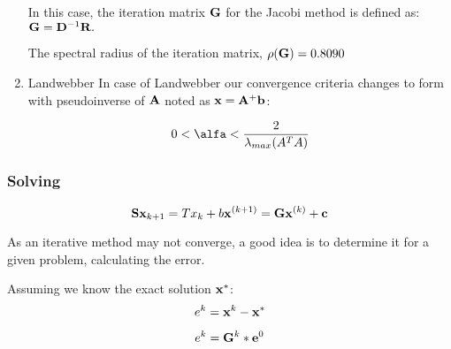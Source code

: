 \begin{enumerate}
    In this case, the iteration matrix $ \mathbf{G} $ for the Jacobi method is defined as:
    $ \mathbf{G} = \mathbf{D}^{-1}\mathbf{R}. $

    The spectral radius of the iteration matrix, $ \rho(\mathbf{G}) = 0.8090$

  \item Landwebber
  In case of Landwebber our convergence criteria changes to form with pseudoinverse of $\mathbf{A}$ noted as $\mathbf{x} = \mathbf{A}^+ \mathbf{b}$:
  
  \begin{equation*}
    0 < \alfa < \frac{2}{\lambda_{max}(A^TA)}
  \end{equation*}
\end{enumerate}
\subsubsection*{Solving}

\begin{equation*}
  \mathbf{S}\mathbf{x}_{k+1} = Tx_k + b
  \mathbf{x}^{(k+1)} = \mathbf{G}\mathbf{x}^{(k)} + \mathbf{c}
\end{equation*}

As an iterative method may not converge, a good idea is to determine it for a given problem, calculating the error.

Assuming we know the exact solution $\mathbf{x}^*$:
\begin{equation*}
  e^k = \mathbf{x}^k - \mathbf{x}^*
\end{equation*}

\begin{equation}
  e^k = \mathbf{G}^k * \mathbf{e}^0
\end{equation}

